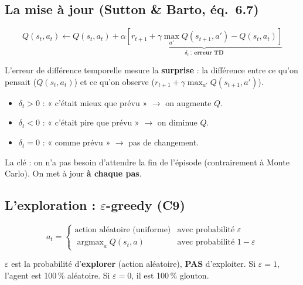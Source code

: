 \documentclass[11pt,a4paper]{article}
\DeclareMathOperator*{\argmax}{argmax}
\begin{document}
\subsection{La mise à jour (Sutton \& Barto, éq.~6.7)}

\begin{equation}
\boxed{Q(s_t, a_t) \leftarrow Q(s_t, a_t) + \alpha \underbrace{\left[r_{t+1} + \gamma \max_{a'} Q(s_{t+1}, a') - Q(s_t, a_t)\right]}_{\delta_t\ :\ \textbf{erreur TD}}}
\label{eq:qlearning}
\end{equation}

\begin{defbox}
L'erreur de différence temporelle mesure la \textbf{surprise} : la différence entre ce qu'on pensait ($Q(s_t, a_t)$) et ce qu'on observe ($r_{t+1} + \gamma \max_{a'} Q(s_{t+1}, a')$).
\begin{itemize}[nosep]
  \item $\delta_t > 0$ : « c'était mieux que prévu » $\to$ on augmente $Q$.
  \item $\delta_t < 0$ : « c'était pire que prévu » $\to$ on diminue $Q$.
  \item $\delta_t = 0$ : « comme prévu » $\to$ pas de changement.
\end{itemize}
La clé : on n'a pas besoin d'attendre la fin de l'épisode (contrairement à Monte Carlo). On met à jour \textbf{à chaque pas}.
\end{defbox}

\subsection{L'exploration : $\varepsilon$-greedy (C9)}

\begin{equation}
a_t = \begin{cases}
\text{action aléatoire (uniforme)} & \text{avec probabilité } \varepsilon \\
\argmax_a Q(s_t, a) & \text{avec probabilité } 1 - \varepsilon
\end{cases}
\end{equation}

\begin{warnbox}
$\varepsilon$ est la probabilité d'\textbf{explorer} (action aléatoire), \textbf{PAS} d'exploiter. Si $\varepsilon = 1$, l'agent est 100\,\% aléatoire. Si $\varepsilon = 0$, il est 100\,\% glouton.
\end{warnbox}
\end{document}
